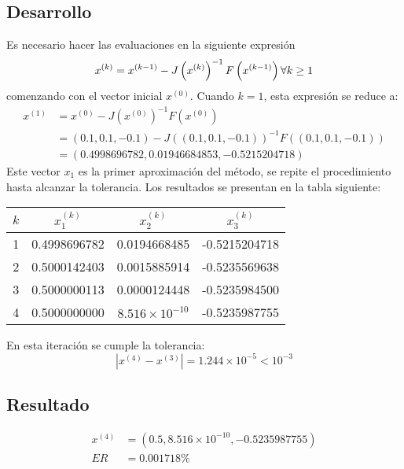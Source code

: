 \begin{exerciseT}
\subsection*{Desarrollo}
Es necesario hacer las evaluaciones en la siguiente expresión 
\[ 
	x^{(k)} = x^{(k-1)} - J\left(x^{(k)}\right)^{-1}F\left(x^{(k-1)} \right)\\
	\forall k\geq 1
\]
comenzando con el vector inicial $x^{(0)}$. Cuando $k=1$, esta expresión se reduce a:
\begin{align*}
	x^{(1)} &= x^{(0)} - J\left(x^{(0)}\right)^{-1}F\left(x^{(0)} \right)\\
		&= (0.1, 0.1, -0.1) - J\left((0.1, 0.1, -0.1)\right)^{-1}F\left((0.1, 0.1, -0.1) \right)\\
		&= (0.4998696782, 0.01946684853, -0.5215204718)
\end{align*}
Este vector $x_1$ es la primer aproximación del método, se repite el procedimiento hasta alcanzar la tolerancia.
Los resultados se presentan en la tabla siguiente:
\begin{table}[H]
	\centering
	\begin{tabular}{cccc}
		\toprule
		$k$ & $x_1^{(k)}$ & $x_2^{(k)}$ & $x_3^{(k)}$ \\
		\midrule
		1 & 0.4998696782 & 0.0194668485 & -0.5215204718 \\
		2 & 0.5000142403 & 0.0015885914 & -0.5235569638 \\
		3 & 0.5000000113 & 0.0000124448 & -0.5235984500 \\
		4 & 0.5000000000 & $8.516\times 10^{-10}$ & -0.5235987755\\
		\bottomrule	
	\end{tabular}
\end{table}
En esta iteración se cumple la tolerancia:
\[ |x^{(4)} - x^{(3)}| = 1.244\times 10^{-5} < 10^{-3}\]

\subsection*{Resultado}
\begin{align*}
	x^{(4)} &= (0.5, 8.516\times 10^{-10}, -0.5235987755) \\
	ER &= 0.001718\%
\end{align*}

\end{exerciseT}


